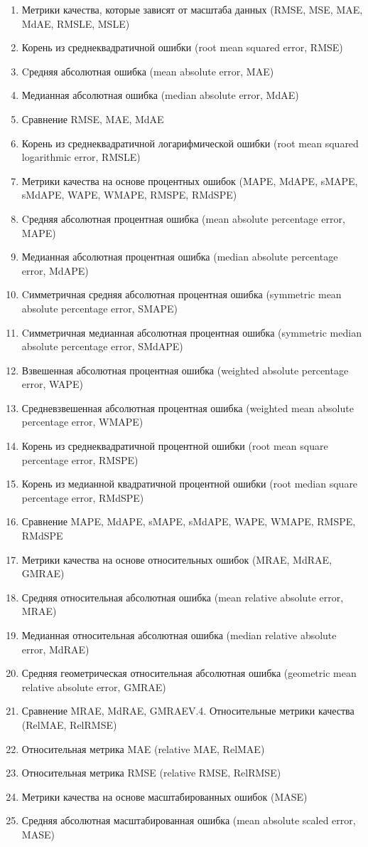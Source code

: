\begin{enumerate}
  \item Метрики качества, которые зависят от масштаба данных
    (RMSE, MSE, MAE, MdAE, RMSLE, MSLE)
  \item Корень из среднеквадратичной ошибки (root mean squared error, RMSE)
  \item Cредняя абсолютная ошибка (mean absolute error, MAE)
  \item Медианная абсолютная ошибка (median absolute error, MdAE)
  \item Сравнение RMSE, MAE, MdAE
  \item Корень из среднеквадратичной логарифмической ошибки
    (root mean squared logarithmic error, RMSLE)
  \item Метрики качества на основе процентных ошибок
    (MAPE, MdAPE, sMAPE, sMdAPE, WAPE, WMAPE, RMSPE, RMdSPE)
  \item Cредняя абсолютная процентная ошибка
    (mean absolute percentage error, MAPE)
  \item Медианная абсолютная процентная ошибка
    (median absolute percentage error, MdAPE)
  \item Cимметричная средняя абсолютная процентная ошибка
    (symmetric mean absolute percentage error, SMAPE)
  \item Cимметричная медианная абсолютная процентная ошибка
    (symmetric median absolute percentage error, SMdAPE)
  \item Взвешенная абсолютная процентная ошибка
    (weighted absolute percentage error, WAPE)
  \item Средневзвешенная абсолютная процентная ошибка
    (weighted mean absolute percentage error, WMAPE)
  \item Корень из среднеквадратичной процентной ошибки
    (root mean square percentage error, RMSPE)
  \item Корень из медианной квадратичной процентной ошибки
    (root median square percentage error, RMdSPE)
  \item Сравнение MAPE, MdAPE, sMAPE, sMdAPE, WAPE, WMAPE,
    RMSPE, RMdSPE
  \item Метрики качества на основе относительных ошибок
    (MRAE, MdRAE, GMRAE)
  \item Средняя относительная абсолютная ошибка
    (mean relative absolute error, MRAE)
  \item Медианная относительная абсолютная ошибка
    (median relative absolute error, MdRAE)
  \item Средняя геометрическая относительная абсолютная ошибка
    (geometric mean relative absolute error, GMRAE)
  \item Сравнение MRAE, MdRAE, GMRAEV.4. Относительные метрики
    качества (RelMAE, RelRMSE)
  \item Относительная метрика MAE (relative MAE, RelMAE)
  \item Относительная метрика RMSE (relative RMSE, RelRMSE)
  \item Метрики качества на основе масштабированных ошибок
    (MASE)
  \item Средняя абсолютная масштабированная ошибка
    (mean absolute scaled error, MASE)

\end{enumerate}